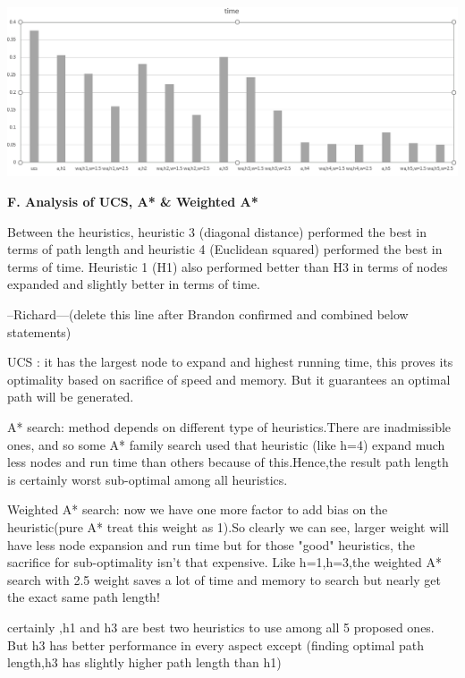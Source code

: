 \documentclass[12pt, letterpaper]{article}
\begin{document}
\medskip

\noindent \includegraphics[scale=0.5]{"avg-runtime"}

\medskip

\pagebreak %

\noindent \textbf{F. Analysis of UCS, A* \& Weighted A*}

Between the heuristics, heuristic 3 (diagonal distance) performed the best in terms of path length and heuristic 4 (Euclidean squared) performed the best in terms of time. Heuristic 1 (H1) also performed better than H3 in terms of nodes expanded and slightly better in terms of time. 

--Richard---(delete this line after Brandon confirmed and combined below statements)\newline

UCS : it has the largest node to expand and highest running time, this proves its optimality based on sacrifice of speed and memory. But it guarantees an optimal path will be generated.\newline

A* search: method depends on different type of heuristics.There are inadmissible ones, and so some A* family search used that heuristic (like h=4) expand much less nodes and run time than others because of this.Hence,the result path length is certainly worst sub-optimal among all heuristics.\newline

Weighted A* search: now we have one more factor to add bias on the heuristic(pure A* treat this weight as 1).So clearly we can see, larger weight will have less node expansion and run time but for those "good" heuristics, the sacrifice for sub-optimality isn't that expensive. Like h=1,h=3,the weighted A* search with 2.5 weight saves a lot of time and memory to search but nearly get the exact same path length!\newline

certainly ,h1 and h3 are best two heuristics to use among all 5 proposed ones. But h3 has better performance in every aspect except (finding optimal path length,h3 has slightly higher path length than h1)
\end{document}
